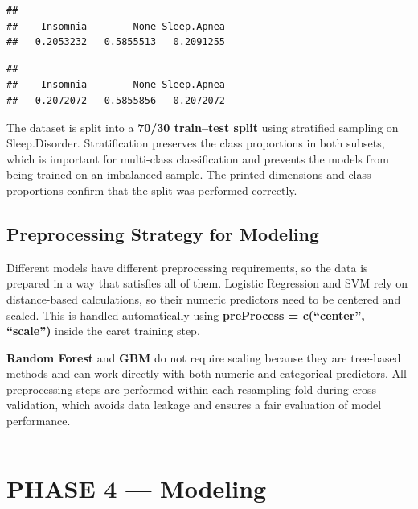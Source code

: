 \documentclass[
]{article}
\newenvironment{Shaded}{\begin{snugshade}}{\end{snugshade}}
\newcommand{\FunctionTok}[1]{\textcolor[rgb]{0.13,0.29,0.53}{\textbf{#1}}}
\newcommand{\NormalTok}[1]{#1}
\newcommand{\SpecialCharTok}[1]{\textcolor[rgb]{0.81,0.36,0.00}{\textbf{#1}}}
\begin{document}
\begin{verbatim}
## 
##    Insomnia        None Sleep.Apnea 
##   0.2053232   0.5855513   0.2091255
\end{verbatim}

\begin{Shaded}
\end{Shaded}

\begin{verbatim}
## 
##    Insomnia        None Sleep.Apnea 
##   0.2072072   0.5855856   0.2072072
\end{verbatim}

The dataset is split into a \textbf{70/30 train--test split} using
stratified sampling on Sleep.Disorder. Stratification preserves the
class proportions in both subsets, which is important for multi-class
classification and prevents the models from being trained on an
imbalanced sample. The printed dimensions and class proportions confirm
that the split was performed correctly.

\subsection{Preprocessing Strategy for
Modeling}\label{preprocessing-strategy-for-modeling}

Different models have different preprocessing requirements, so the data
is prepared in a way that satisfies all of them. Logistic Regression and
SVM rely on distance-based calculations, so their numeric predictors
need to be centered and scaled. This is handled automatically using
\textbf{preProcess = c(``center'', ``scale'')} inside the caret training
step.

\textbf{Random Forest} and \textbf{GBM} do not require scaling because
they are tree-based methods and can work directly with both numeric and
categorical predictors. All preprocessing steps are performed within
each resampling fold during cross-validation, which avoids data leakage
and ensures a fair evaluation of model performance.

\begin{center}\rule{0.5\linewidth}{0.5pt}\end{center}

\section{\texorpdfstring{\textbf{PHASE 4 ---
Modeling}}{PHASE 4 --- Modeling}}\label{phase-4-modeling}
\end{document}
